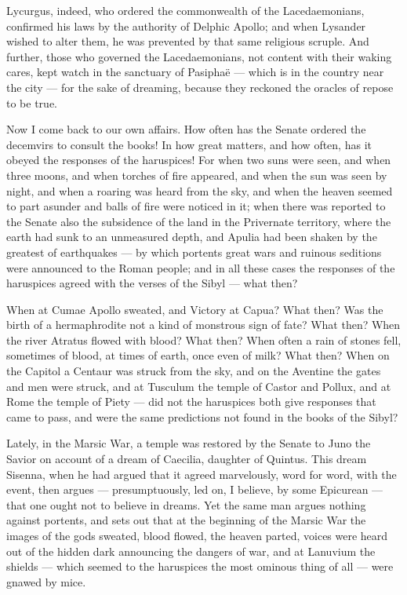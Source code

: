  Lycurgus, indeed, who ordered the commonwealth of the Lacedaemonians, confirmed his laws by the authority of Delphic Apollo; and when Lysander wished to alter them, he was prevented by that same religious scruple. And further, those who governed the Lacedaemonians, not content with their waking cares, kept watch in the sanctuary of Pasiphaë — which is in the country near the city — for the sake of dreaming, because they reckoned the oracles of repose to be true.

 Now I come back to our own affairs. How often has the Senate ordered the decemvirs to consult the books! In how great matters, and how often, has it obeyed the responses of the haruspices! For when two suns were seen, and when three moons, and when torches of fire appeared, and when the sun was seen by night, and when a roaring was heard from the sky, and when the heaven seemed to part asunder and balls of fire were noticed in it; when there was reported to the Senate also the subsidence of the land in the Privernate territory, where the earth had sunk to an unmeasured depth, and Apulia had been shaken by the greatest of earthquakes — by which portents great wars and ruinous seditions were announced to the Roman people; and in all these cases the responses of the haruspices agreed with the verses of the Sibyl — what then?

 When at Cumae Apollo sweated, and Victory at Capua? What then? Was the birth of a hermaphrodite not a kind of monstrous sign of fate? What then? When the river Atratus flowed with blood? What then? When often a rain of stones fell, sometimes of blood, at times of earth, once even of milk? What then? When on the Capitol a Centaur was struck from the sky, and on the Aventine the gates and men were struck, and at Tusculum the temple of Castor and Pollux, and at Rome the temple of Piety — did not the haruspices both give responses that came to pass, and were the same predictions not found in the books of the Sibyl?

 Lately, in the Marsic War, a temple was restored by the Senate to Juno the Savior on account of a dream of Caecilia, daughter of Quintus. This dream Sisenna, when he had argued that it agreed marvelously, word for word, with the event, then argues — presumptuously, led on, I believe, by some Epicurean — that one ought not to believe in dreams. Yet the same man argues nothing against portents, and sets out that at the beginning of the Marsic War the images of the gods sweated, blood flowed, the heaven parted, voices were heard out of the hidden dark announcing the dangers of war, and at Lanuvium the shields — which seemed to the haruspices the most ominous thing of all — were gnawed by mice.

